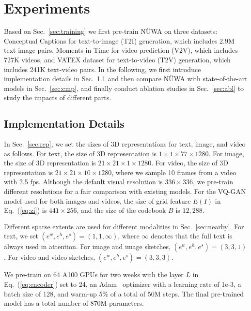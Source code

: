 \section{Experiments} \label{sec:exp}
Based on Sec.~\ref{sec:training} we first pre-train NÜWA on three datasets: Conceptual Captions\cite{linMicrosoftCocoCommon2014} for text-to-image (T2I) generation, which includes 2.9M text-image pairs, Moments in Time\cite{monfortMomentsTimeDataset2019} for video prediction (V2V), which includes 727K videos, and VATEX dataset\cite{wangVatexLargescaleHighquality2019} for text-to-video (T2V) generation, which includes 241K text-video pairs. In the following, we first introduce implementation details in Sec.~\ref{sec:imp} and then compare NÜWA with state-of-the-art models in Sec.~\ref{sec:cmp}, and finally conduct ablation studies in Sec.~\ref{sec:abl} to study the impacts of different parts.

\subsection{Implementation Details} \label{sec:imp}
In Sec.~\ref{sec:rep}, we set the sizes of 3D representations for text, image, and video as follows. For text, the size of 3D representation is $1\times 1\times 77\times 1280$. For image, the size of 3D representation is $21\times 21\times 1\times 1280$. For video, the size of 3D representation is $21\times 21\times 10\times 1280$, where we sample 10 frames from a video with 2.5 fps. Although the default visual resolution is $336\times 336$, we pre-train different resolutions for a fair comparison with existing models. For the VQ-GAN model used for both images and videos, the size of grid feature $E(I)$ in Eq.~(\ref{eq:zi}) is $441\times 256$, and the size of the codebook $B$ is $12,288$.

Different sparse extents are used for different modalities in Sec.~\ref{sec:nearby}. 
For text, we set $(e^w,e^h,e^s)=(1,1,\infty)$, where $\infty$ denotes that the full text is always used in attention. For image and image sketches, $(e^w,e^h,e^s)=(3,3,1)$. For video and video sketches, $(e^w,e^h,e^s)=(3,3,3)$. 

We pre-train on 64 A100 GPUs for two weeks with the layer $L$ in Eq.~(\ref{eq:encoder}) set to 24, an Adam~\cite{Kingma_Adammethodstochastic_2014} optimizer with a learning rate of 1e-3, a batch size of 128, and warm-up 5\% of a total of 50M steps. The final pre-trained model has a total number of 870M parameters.


